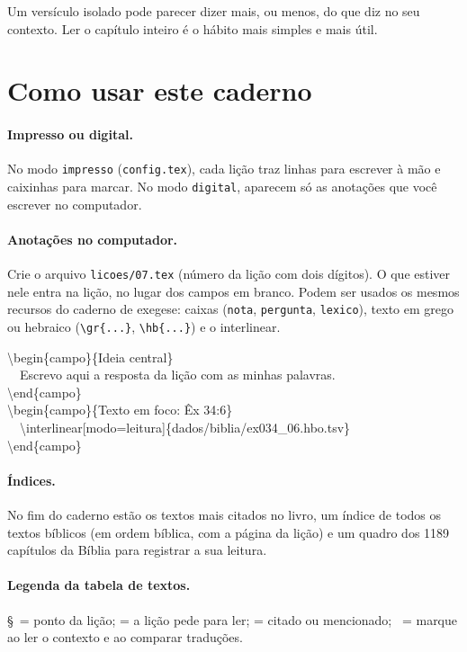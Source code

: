 \begin{alerta}
Um versículo isolado pode parecer dizer mais, ou menos, do que diz no seu
contexto. Ler o capítulo inteiro é o hábito mais simples e mais útil.
\end{alerta}

\section{Como usar este caderno}

\paragraph{Impresso ou digital.} No modo \texttt{impresso}
(\texttt{config.tex}), cada lição traz linhas para escrever à mão e caixinhas
para marcar. No modo \texttt{digital}, aparecem só as anotações que você
escrever no computador.

\paragraph{Anotações no computador.} Crie o arquivo \texttt{licoes/07.tex}
(número da lição com dois dígitos). O que estiver nele entra na lição, no
lugar dos campos em branco. Podem ser usados os mesmos recursos do caderno de
exegese: caixas (\texttt{nota}, \texttt{pergunta}, \texttt{lexico}), texto em
grego ou hebraico (\verb|\gr{...}|, \verb|\hb{...}|) e o interlinear.

\begin{nota}
\small\ttfamily
\textbackslash begin\{campo\}\{Ideia central\}\\
\ \ Escrevo aqui a resposta da lição com as minhas palavras.\\
\textbackslash end\{campo\}\\
\textbackslash begin\{campo\}\{Texto em foco: Êx 34:6\}\\
\ \ \textbackslash interlinear[modo=leitura]\{dados/biblia/ex034\_06.hbo.tsv\}\\
\textbackslash end\{campo\}
\end{nota}

\paragraph{Índices.} No fim do caderno estão os textos mais citados no livro,
um índice de todos os textos bíblicos (em ordem bíblica, com a página da
lição) e um quadro dos 1189 capítulos da Bíblia para registrar a sua leitura.

\paragraph{Legenda da tabela de textos.}
\S\ = ponto da lição;  = a lição pede para ler;
 = citado ou mencionado; \EBcaixa\ = marque ao ler o
contexto e ao comparar traduções.
